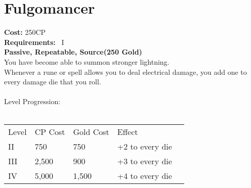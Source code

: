 \section{Fulgomancer}\label{perk:fulgomancer}
\textbf{Cost:} 250CP\\
\textbf{Requirements:}~ I\\
\textbf{Passive, Repeatable, Source(250 Gold)}\\
You have become able to summon stronger lightning.\\
Whenever a rune or spell allows you to deal electrical damage, you add one to every damage die that you roll.\\
\\
Level Progression:\\
\\
\begin{tabular}{l | l | l | l | l}
    Level & CP Cost & Gold Cost &  Effect\\
    II & 750 & 750 & +2 to every die\\
    III & 2,500 & 900 & +3 to every die\\
    IV & 5,000 & 1,500 & +4 to every die\\
\end{tabular}